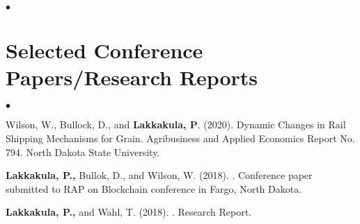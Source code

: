 \documentclass[margin,line]{res}
\newenvironment{list2}{
  \begin{list}{$\bullet$}{%
    \setlength{\itemsep}{0in}
    \setlength{\parsep}{0in} \setlength{\parskip}{0in}
    \setlength{\topsep}{0in} \setlength{\partopsep}{0in}
    \setlength{\leftmargin}{0.2in}}}{\end{list}}
\begin{document}
\begin{resume}
\begin{list2}
\end{list2}

\section{\sc Selected Conference Papers/Research Reports}
\begin{list2}
\item Wilson, W., Bullock, D., and {\bf Lakkakula, P}. (2020). Dynamic Changes in Rail Shipping Mechanisms for Grain. Agribusiness and Applied Economics Report No. 794. North Dakota State University.
\item {\bf Lakkakula, P.,} Bullok, D., and Wilson, W. (2018). . Conference paper submitted to RAP on Blockchain conference in Fargo, North Dakota. 
\item {\bf Lakkakula, P.,} and Wahl, T. 
(2018). . Research Report. %


\end{list2}
\end{resume}
\end{document}
